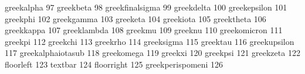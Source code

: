  greekalpha                         97
 greekbeta                          98
 greekfinalsigma                    99
 greekdelta                        100
 greekepsilon                      101
 greekphi                          102
 greekgamma                        103
 greeketa                          104
 greekiota                         105
 greektheta                        106
 greekkappa                        107
 greeklambda                       108
 greekmu                           109
 greeknu                           110
 greekomicron                      111
 greekpi                           112
 greekchi                          113
 greekrho                          114
 greeksigma                        115
 greektau                          116
 greekupsilon                      117
 greekalphaiotasub                 118
 greekomega                        119
 greekxi                           120
 greekpsi                          121
 greekzeta                         122
 floorleft                         123
 textbar                           124
 floorright                        125
 greekperispomeni                  126

